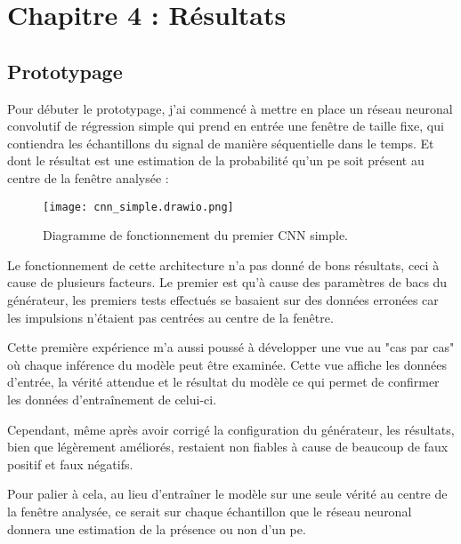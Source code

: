 \chapter{Chapitre 4 : Résultats}



\section{Prototypage}
Pour débuter le prototypage, j'ai commencé à mettre en place un réseau neuronal convolutif de régression simple qui prend en 
entrée une fenêtre de taille fixe, qui contiendra les échantillons du signal de manière séquentielle dans le temps.
Et dont le résultat est une estimation de la probabilité qu'un \gls{pe} soit présent au centre de la fenêtre analysée :

\begin{figure}[tbph!]
	\centering
	\texttt{[image: cnn\_simple.drawio.png]}
	\caption[Diagramme de fonctionnement du premier CNN simple]{Diagramme de fonctionnement du premier CNN simple.}
\end{figure}

Le fonctionnement de cette architecture n'a pas donné de bons résultats, ceci à cause de plusieurs facteurs. Le premier est qu'à cause des paramètres
de bacs du générateur, les premiers tests effectués se basaient sur des données erronées car les impulsions n'étaient pas centrées au centre de la fenêtre.

Cette première expérience m'a aussi poussé à développer une vue au "cas par cas" où chaque inférence du modèle peut être examinée.
Cette vue affiche les données d'entrée, la vérité attendue et le résultat du modèle ce qui permet de confirmer les données d'entraînement de celui-ci. 

Cependant, même après avoir corrigé la configuration du générateur, les résultats, bien que légèrement améliorés, restaient non fiables à cause de beaucoup de
faux positif et faux négatifs.

Pour palier à cela, au lieu d'entraîner le modèle sur une seule vérité au centre de la fenêtre analysée, ce serait sur chaque 
échantillon que le réseau neuronal donnera une estimation de la présence ou non d'un \gls{pe}.

